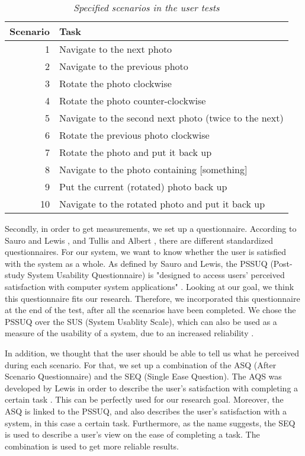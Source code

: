 \documentclass[11pt,a4paper]{article}
\begin{document}
\begin{table}
\begin{center}
\begin{tabular}{r|l}
\textbf{Scenario} & \textbf{Task} \\
\hline
1 & Navigate to the next photo \\ 
2 & Navigate to the previous photo \\
3 & Rotate the photo clockwise \\
4 & Rotate the photo counter-clockwise \\
5 & Navigate to the second next photo (twice to the next)\\ 
6 & Rotate the previous photo clockwise \\
7 & Rotate the photo and put it back up \\
8 & Navigate to the photo containing [something] \\
9 & Put the current (rotated) photo back up \\
10 & Navigate to the rotated photo and put it back up \\
\end{tabular}
\end{center}
\caption{\textit{Specified scenarios in the user tests}}
\label{tab:scen}
\end{table}



Secondly, in order to get measurements, we set up a questionnaire. According to Sauro and Lewis \cite{Quantify}, and Tullis and Albert \cite{Measure}, there are different standardized questionnaires. For our system, we want to know whether the user is satisfied with the system as a whole. As defined by Sauro and Lewis, the PSSUQ (Post-study System Usability Questionnaire) is "designed to access users' perceived satisfaction with computer system applications" \cite{Quantify}. Looking at our goal, we think this questionnaire fits our research. Therefore, we incorporated this questionnaire at the end of the test, after all the scenarios have been completed. We chose the PSSUQ over the SUS (System Usablity Scale), which can also be used as a measure of the usability of a system, due to an increased reliability \cite{Quantify}.

In addition, we thought that the user should be able to tell us what he perceived during each scenario. For that, we set up a combination of the ASQ (After Scenario Questionnaire) and the SEQ (Single Ease Question). The AQS was developed by Lewis in order to describe the user's satisfaction with completing a certain task \cite{Quantify}\cite{ASQ}. This can be perfectly used for our research goal. Moreover, the ASQ is linked to the PSSUQ, and also describes the user's satisfaction with a system, in this case a certain task. Furthermore, as the name suggests, the SEQ is used to describe a user's view on the ease of completing a task. The combination is used to get more reliable results.
\end{document}
